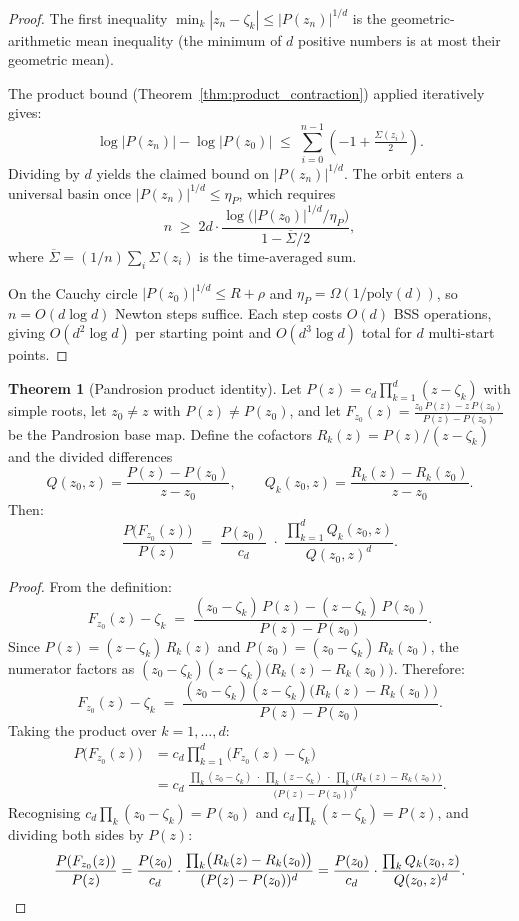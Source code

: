 \documentclass[11pt,a4paper]{article}
\theoremstyle{definition}
\newtheorem{theorem}{Theorem}[section]
\begin{document}
\begin{proof}
The first inequality $\min_k|z_n - \zeta_k| \leq |P(z_n)|^{1/d}$ is the geometric-arithmetic mean inequality (the minimum of $d$ positive numbers is at most their geometric mean).

The product bound (Theorem~\ref{thm:product_contraction}) applied iteratively gives:
\[
  \log|P(z_n)| - \log|P(z_0)| \;\leq\; \sum_{i=0}^{n-1}\left(-1 + \tfrac{\Sigma(z_i)}{2}\right).
\]
Dividing by $d$ yields the claimed bound on $|P(z_n)|^{1/d}$.  The orbit enters a universal basin once $|P(z_n)|^{1/d} \leq \eta_P$, which requires
\[
  n \;\geq\; 2d\cdot\frac{\log\bigl(|P(z_0)|^{1/d}/\eta_P\bigr)}{1 - \overline{\Sigma}/2},
\]
where $\overline{\Sigma} = (1/n)\sum_i \Sigma(z_i)$ is the time-averaged sum.

On the Cauchy circle $|P(z_0)|^{1/d} \leq R + \rho$ and $\eta_P = \Omega(1/\mathrm{poly}(d))$, so $n = O(d\log d)$ Newton steps suffice.  Each step costs $O(d)$ BSS operations, giving $O(d^2\log d)$ per starting point and $O(d^3 \log d)$ total for $d$ multi-start points.
\end{proof}

\begin{theorem}[Pandrosion product identity]
\label{thm:pandrosion_product}
Let $P(z) = c_d\prod_{k=1}^d (z - \zeta_k)$ with simple roots, let $z_0 \neq z$ with $P(z) \neq P(z_0)$, and let $F_{z_0}(z) = \frac{z_0\,P(z) - z\,P(z_0)}{P(z) - P(z_0)}$ be the Pandrosion base map.  Define the cofactors $R_k(z) = P(z)/(z - \zeta_k)$ and the divided differences
\[
  Q(z_0,z) = \frac{P(z) - P(z_0)}{z - z_0}, \qquad
  Q_k(z_0,z) = \frac{R_k(z) - R_k(z_0)}{z - z_0}.
\]
Then:
\begin{equation}
  \label{eq:pandrosion_product}
  \frac{P\bigl(F_{z_0}(z)\bigr)}{P(z)}
  \;=\; \frac{P(z_0)}{c_d} \;\cdot\; \frac{\displaystyle\prod_{k=1}^d Q_k(z_0,z)}{Q(z_0,z)^d}.
\end{equation}
\end{theorem}

\begin{proof}
From the definition:
\[
  F_{z_0}(z) - \zeta_k
  \;=\; \frac{(z_0 - \zeta_k)\,P(z) - (z - \zeta_k)\,P(z_0)}{P(z) - P(z_0)}.
\]
Since $P(z) = (z - \zeta_k)\,R_k(z)$ and $P(z_0) = (z_0 - \zeta_k)\,R_k(z_0)$, the numerator factors as $(z_0 - \zeta_k)(z - \zeta_k)\bigl(R_k(z) - R_k(z_0)\bigr)$.  Therefore:
\[
  F_{z_0}(z) - \zeta_k
  \;=\; \frac{(z_0 - \zeta_k)(z - \zeta_k)\bigl(R_k(z) - R_k(z_0)\bigr)}{P(z) - P(z_0)}.
\]
Taking the product over $k = 1, \ldots, d$:
\begin{align*}
  P\bigl(F_{z_0}(z)\bigr)
  &= c_d \prod_{k=1}^d \bigl(F_{z_0}(z) - \zeta_k\bigr) \\
  &= c_d \;\frac{\prod_k(z_0 - \zeta_k) \;\cdot\; \prod_k(z - \zeta_k) \;\cdot\; \prod_k\bigl(R_k(z) - R_k(z_0)\bigr)}{\bigl(P(z) - P(z_0)\bigr)^d}.
\end{align*}
Recognising $c_d\prod_k(z_0-\zeta_k) = P(z_0)$ and $c_d\prod_k(z-\zeta_k) = P(z)$, and dividing both sides by $P(z)$:
\[
  \frac{P(F_{z_0}(z))}{P(z)}
  = \frac{P(z_0)}{c_d} \cdot \frac{\prod_k\bigl(R_k(z)-R_k(z_0)\bigr)}{(P(z)-P(z_0))^d}
  = \frac{P(z_0)}{c_d} \cdot \frac{\prod_k Q_k(z_0,z)}{Q(z_0,z)^d}.
  \qedhere
\]
\end{proof}
\end{document}
